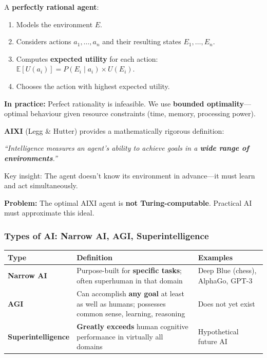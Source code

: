 \begin{defbox}
A \textbf{perfectly rational agent}:
\begin{enumerate}
  \item Models the environment $E$.
  \item Considers actions $a_1, \ldots, a_n$ and their resulting states $E_1, \ldots, E_n$.
  \item Computes \textbf{expected utility} for each action: $\mathbb{E}[U(a_i)] = P(E_i \mid a_i) \times U(E_i)$.
  \item Chooses the action with highest expected utility.
\end{enumerate}

\textbf{In practice:} Perfect rationality is infeasible. We use \textbf{bounded optimality}---optimal behaviour given resource constraints (time, memory, processing power).
\end{defbox}

\begin{tipbox}
\textbf{AIXI} (Legg \& Hutter) provides a mathematically rigorous definition:

\textit{``Intelligence measures an agent's ability to achieve goals in a \textbf{wide range of environments}.''}

Key insight: The agent doesn't know its environment in advance---it must learn and act simultaneously.

\textbf{Problem:} The optimal AIXI agent is \textbf{not Turing-computable}. Practical AI must approximate this ideal.
\end{tipbox}

\bigseparator

\subsubsection{Types of AI: Narrow AI, AGI, Superintelligence}

\begin{center}
\renewcommand{\arraystretch}{1.4}
\begin{tabular}{@{} l p{5cm} p{5cm} @{}}
\toprule
\textbf{Type} & \textbf{Definition} & \textbf{Examples} \\
\midrule
\textbf{Narrow AI} & Purpose-built for \textbf{specific tasks}; often superhuman in that domain & Deep Blue (chess), AlphaGo, GPT-3 \\
\textbf{AGI} & Can accomplish \textbf{any goal} at least as well as humans; possesses common sense, learning, reasoning & Does not yet exist \\
\textbf{Superintelligence} & \textbf{Greatly exceeds} human cognitive performance in virtually all domains & Hypothetical future AI \\
\bottomrule
\end{tabular}
\end{center}

